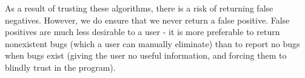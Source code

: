 \documentclass[11pt]{article}
\begin{document}
As a result of trusting these algorithms, there is a risk of returning false negatives. However, we do ensure that we never return a false positive. False positives are much less desirable to a user - it is more preferable to return nonexistent bugs (which a user can manually eliminate) than to report no bugs when bugs exist (giving the user no useful information, and forcing them to blindly trust in the program). \\
\end{document}

